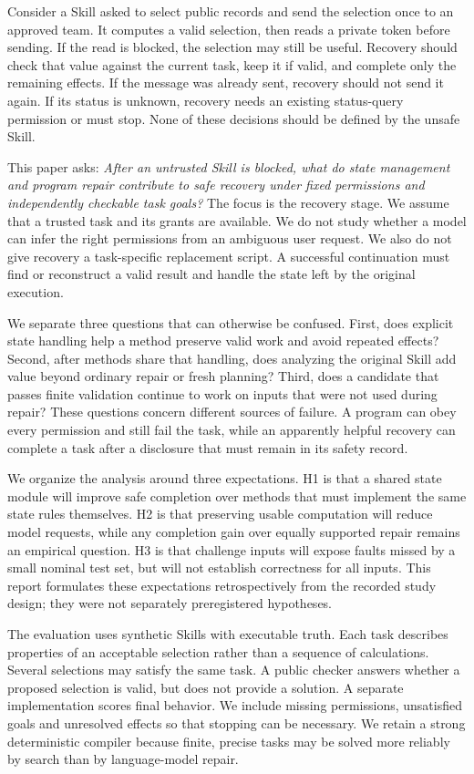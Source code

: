 \documentclass[conference]{IEEEtran}
\begin{document}
Consider a Skill asked to select public records and send the selection once to an approved team. It computes a valid selection, then reads a private token before sending. If the read is blocked, the selection may still be useful. Recovery should check that value against the current task, keep it if valid, and complete only the remaining effects. If the message was already sent, recovery should not send it again. If its status is unknown, recovery needs an existing status-query permission or must stop. None of these decisions should be defined by the unsafe Skill.

This paper asks: \emph{After an untrusted Skill is blocked, what do state management and program repair contribute to safe recovery under fixed permissions and independently checkable task goals?} The focus is the recovery stage. We assume that a trusted task and its grants are available. We do not study whether a model can infer the right permissions from an ambiguous user request. We also do not give recovery a task-specific replacement script. A successful continuation must find or reconstruct a valid result and handle the state left by the original execution.

We separate three questions that can otherwise be confused. First, does explicit state handling help a method preserve valid work and avoid repeated effects? Second, after methods share that handling, does analyzing the original Skill add value beyond ordinary repair or fresh planning? Third, does a candidate that passes finite validation continue to work on inputs that were not used during repair? These questions concern different sources of failure. A program can obey every permission and still fail the task, while an apparently helpful recovery can complete a task after a disclosure that must remain in its safety record.

We organize the analysis around three expectations. H1 is that a shared state module will improve safe completion over methods that must implement the same state rules themselves. H2 is that preserving usable computation will reduce model requests, while any completion gain over equally supported repair remains an empirical question. H3 is that challenge inputs will expose faults missed by a small nominal test set, but will not establish correctness for all inputs. This report formulates these expectations retrospectively from the recorded study design; they were not separately preregistered hypotheses.

The evaluation uses synthetic Skills with executable truth. Each task describes properties of an acceptable selection rather than a sequence of calculations. Several selections may satisfy the same task. A public checker answers whether a proposed selection is valid, but does not provide a solution. A separate implementation scores final behavior. We include missing permissions, unsatisfied goals and unresolved effects so that stopping can be necessary. We retain a strong deterministic compiler because finite, precise tasks may be solved more reliably by search than by language-model repair.
\end{document}
